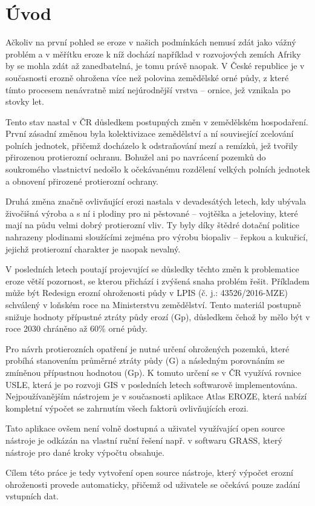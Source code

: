 \chapter{Úvod}
Ačkoliv na první pohled se eroze v našich podmínkách nemusí zdát jako vážný problém a v měřítku eroze k níž dochází například v rozvojových zemích Afriky by se mohla zdát až zanedbatelná, je tomu právě naopak. V České republice je v současnosti erozně ohrožena více než polovina zemědělské orné půdy, z které tímto procesem nenávratně mizí nejúrodnější vrstva – ornice, jež vznikala po stovky let.

Tento stav nastal v ČR důsledkem postupných změn v zemědělském hospodaření. První zásadní změnou byla kolektivizace zemědělství a ní související zcelování polních jednotek, přičemž docházelo k odstraňování mezí a remízků, jež tvořily přirozenou protierozní ochranu. Bohužel ani po navrácení pozemků do soukromého vlastnictví nedošlo k očekávanému rozdělení velkých polních jednotek a obnovení přirozené protierozní ochrany. 

Druhá změna značně ovlivňující erozi nastala v devadesátých letech, kdy ubývala živočišná výroba a s ní i plodiny pro ni pěstované – vojtěška a jeteloviny, které mají na půdu velmi dobrý protierozní vliv. Ty byly díky štědré dotační politice nahrazeny plodinami sloužícími zejména pro výrobu biopaliv – řepkou a kukuřicí, jejichž protierozní charakter je naopak nevalný. 

V posledních letech poutají projevující se důsledky těchto změn k problematice eroze větší pozornost, se kterou přichází i zvýšená snaha problém řešit. Příkladem může být Redesign erozní ohroženosti půdy v LPIS (č. j.: 43526/2016-MZE) schválený v loňském roce na Ministerstvu zemědělství. Tento materiál postupně snižuje hodnoty přípustné ztráty půdy erozí (Gp), důsledkem čehož by mělo být v roce 2030 chráněno až 60\% orné půdy.

Pro návrh protierozních opatření je nutné určení ohrožených pozemků, které probíhá stanovením průměrné ztráty půdy (G) a následným porovnáním se zmíněnou přípustnou hodnotou (Gp). K tomuto určení se v ČR využívá rovnice USLE, která je po rozvoji GIS v posledních letech softwarově implementována. Nejpoužívanějším nástrojem je v současnosti aplikace Atlas EROZE, která nabízí kompletní výpočet se zahrnutím všech faktorů ovlivňujících erozi. 

Tato aplikace ovšem není volně dostupná a uživatel využívající open source nástroje je odkázán na vlastní ruční řešení např. v softwaru GRASS, který nástroje pro dané kroky výpočtu obsahuje. 

Cílem této práce je tedy vytvoření open source nástroje, který výpočet erozní ohroženosti provede automaticky, přičemž od uživatele se očekává pouze zadání vstupních dat. 
